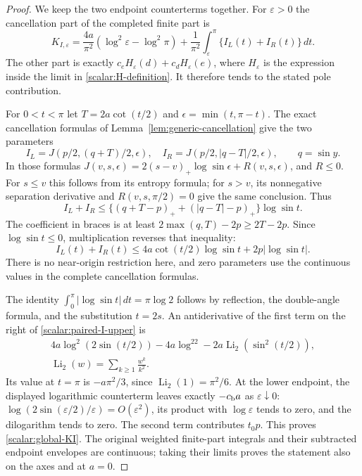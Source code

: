 \begin{proof}
We keep the two endpoint counterterms together.  For $\varepsilon>0$
the cancellation part of the completed finite part is
\[
 K_{I,\varepsilon}=
 \frac{4a}{\pi^2}(\log^2\varepsilon-\log^2\pi)
       +\frac1{\pi^2}\int_\varepsilon^\pi
                        \{I_L(t)+I_R(t)\}\,dt.
\]
The other part is exactly
$c_eH_\varepsilon(d)+c_dH_\varepsilon(e)$, where $H_\varepsilon$
is the expression inside the limit in \eqref{scalar:H-definition}.
It therefore tends to the stated pole contribution.

For $0<t<\pi$ let $T=2a\cot(t/2)$ and
$\epsilon=\min(t,\pi-t)$.  The exact cancellation formulas of
Lemma~\ref{lem:generic-cancellation} give the two parameters
\[
 I_L=J(p/2,(q+T)/2,\epsilon),\quad
 I_R=J(p/2,|q-T|/2,\epsilon),\qquad q=\sin y.
\]
In those formulas
$J(v,s,\epsilon)=2(s-v)_+\log\sin\epsilon+R(v,s,\epsilon)$,
and $R\leq0$.  For $s\leq v$ this follows from its entropy formula;
for $s>v$, its nonnegative separation derivative and
$R(v,s,\pi/2)=0$ give the same conclusion.  Thus
\[
 I_L+I_R\leq\{(q+T-p)_++(|q-T|-p)_+\}\log\sin t.
\]
The coefficient in braces is at least $2\max(q,T)-2p\geq2T-2p$.
Since $\log\sin t\leq0$, multiplication reverses that inequality:
\begin{equation}\label{scalar:paired-I-upper}
 I_L(t)+I_R(t)\leq4a\cot(t/2)\log\sin t
                          +2p|\log\sin t|.
\end{equation}
There is no near-origin restriction here, and zero parameters use
the continuous values in the complete cancellation formulas.

The identity
$\int_0^\pi|\log\sin t|\,dt=\pi\log2$ follows by reflection,
the double-angle formula, and the substitution $t=2s$.
An antiderivative of the first term on the right of
\eqref{scalar:paired-I-upper} is
\[
 \begin{gathered}
 4a\log^2(2\sin(t/2))-4a\log^22
                    -2a\operatorname{Li}_2(\sin^2(t/2)),\\
 \operatorname{Li}_2(w)=\sum_{k\geq1}\frac{w^k}{k^2}.
 \end{gathered}
\]
Its value at $t=\pi$ is $-a\pi^2/3$, since
$\operatorname{Li}_2(1)=\pi^2/6$.
At the lower endpoint, the displayed logarithmic counterterm leaves
exactly $-c_{\rm b}a$ as $\varepsilon\downarrow0$:
$\log(2\sin(\varepsilon/2)/\varepsilon)=O(\varepsilon^2)$,
its product with $\log\varepsilon$ tends to zero, and the dilogarithm
tends to zero.  The second term contributes $t_0p$.  This proves
\eqref{scalar:global-KI}.  The original weighted finite-part integrals
and their subtracted endpoint envelopes are continuous; taking their
limits proves the statement also on the axes and at $a=0$.
\end{proof}

